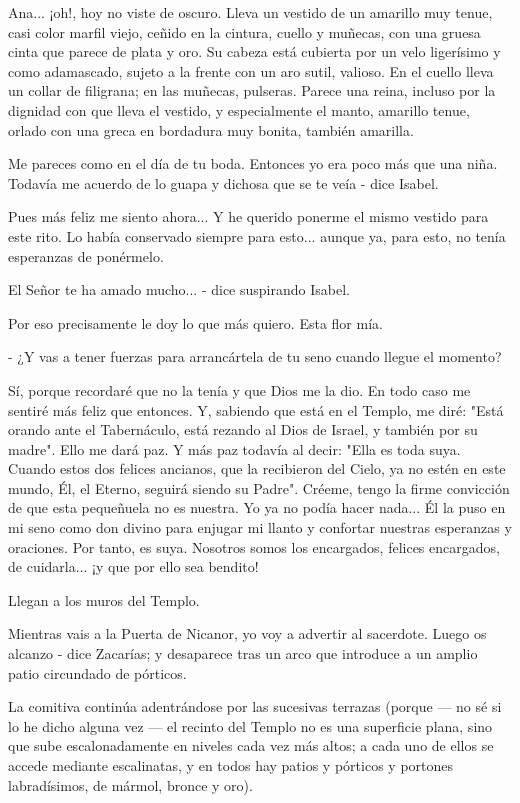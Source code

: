 \documentclass[12pt]{book} %
\begin{document}
Ana... ¡oh!, hoy no viste de oscuro. Lleva un vestido de un amarillo muy tenue, casi color marfil viejo, ceñido en la cintura, cuello y muñecas, con una gruesa cinta que parece de plata y oro. Su cabeza está cubierta por un velo ligerísimo y como adamascado, sujeto a la frente con un aro sutil, valioso. En el cuello lleva un collar de filigrana; en las muñecas, pulseras. Parece una reina, incluso por la dignidad con que lleva el vestido, y especialmente el manto, amarillo tenue, orlado con una greca en bordadura muy bonita, también amarilla. 

Me pareces como en el día de tu boda. Entonces yo era poco más que una niña. Todavía me acuerdo de lo guapa y dichosa que se te veía - dice Isabel. 

Pues más feliz me siento ahora... Y he querido ponerme el mismo vestido para este rito. Lo había conservado siempre para esto... aunque ya, para esto, no tenía esperanzas de ponérmelo. 

El Señor te ha amado mucho... - dice suspirando Isabel. 

Por eso precisamente le doy lo que más quiero. Esta flor mía. 

- ¿Y vas a tener fuerzas para arrancártela de tu seno cuando llegue el momento? 

Sí, porque recordaré que no la tenía y que Dios me la dio. En todo caso me sentiré más feliz que entonces. Y, sabiendo que está en el Templo, me diré: "Está orando ante el Tabernáculo, está rezando al Dios de Israel, y también por su madre". Ello me dará paz. Y más paz todavía al decir: "Ella es toda suya. Cuando estos dos felices ancianos, que la recibieron del Cielo, ya no estén en este mundo, Él, el Eterno, seguirá siendo su Padre". Créeme, tengo la firme convicción de que esta pequeñuela no es nuestra. Yo ya no podía hacer nada... Él la puso en mi seno como don divino para enjugar mi llanto y confortar nuestras esperanzas y oraciones. Por tanto, es suya. Nosotros somos los encargados, felices encargados, de cuidarla... ¡y que por ello sea bendito! 

Llegan a los muros del Templo. 
 
Mientras vais a la Puerta de Nicanor, yo voy a advertir al sacerdote. Luego os alcanzo - dice Zacarías; y desaparece tras un arco que introduce a un amplio patio circundado de pórticos. 

La comitiva continúa adentrándose por las sucesivas terrazas (porque — no sé si lo he dicho alguna vez — el recinto del Templo no es una superficie plana, sino que sube escalonadamente en niveles cada vez más altos; a cada uno de ellos se accede mediante escalinatas, y en todos hay patios y pórticos y portones labradísimos, de mármol, bronce y oro). 
\end{document}
